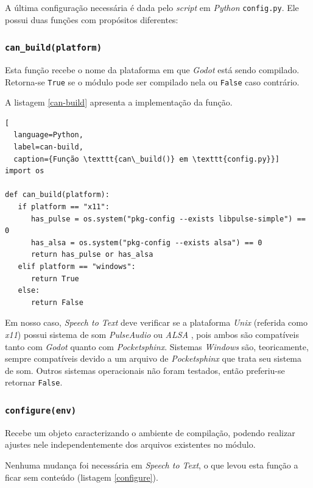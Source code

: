 A última configuração necessária é dada pelo \textit{script} em \textit{Python} \texttt{config.py}. Ele possui duas funções com propósitos diferentes:

\subsubsection{\texttt{can\_build(platform)}}

Esta função recebe o nome da plataforma em que \textit{Godot} está sendo compilado. Retorna-se \texttt{True} se o módulo pode ser compilado nela ou \texttt{False} caso contrário.

A listagem \ref{can-build} apresenta a implementação da função.

\begin{minipage}{\linewidth}
\begin{lstlisting}[
  language=Python,
  label=can-build,
  caption={Função \texttt{can\_build()} em \texttt{config.py}}]
import os

def can_build(platform):
   if platform == "x11":
      has_pulse = os.system("pkg-config --exists libpulse-simple") == 0
      has_alsa = os.system("pkg-config --exists alsa") == 0
      return has_pulse or has_alsa
   elif platform == "windows":
      return True
   else:
      return False
\end{lstlisting}
\end{minipage}

Em nosso caso, \textit{Speech to Text} deve verificar se a plataforma \textit{Unix} (referida como \textit{x11}) possui sistema de som \textit{PulseAudio} \citep{pulseaudio} ou \textit{ALSA} \citep{alsa}, pois ambos são compatíveis tanto com \textit{Godot} quanto com \textit{Pocketsphinx}. Sistemas \textit{Windows} são, teoricamente, sempre compatíveis devido a um arquivo de \textit{Pocketsphinx} que trata seu sistema de som. Outros sistemas operacionais não foram testados, então preferiu-se retornar \texttt{False}.

\subsubsection{\texttt{configure(env)}}

Recebe um objeto caracterizando o ambiente de compilação, podendo realizar ajustes nele independentemente dos arquivos existentes no módulo.

Nenhuma mudança foi necessária em \textit{Speech to Text}, o que levou esta função a ficar sem conteúdo (listagem \ref{configure}).

